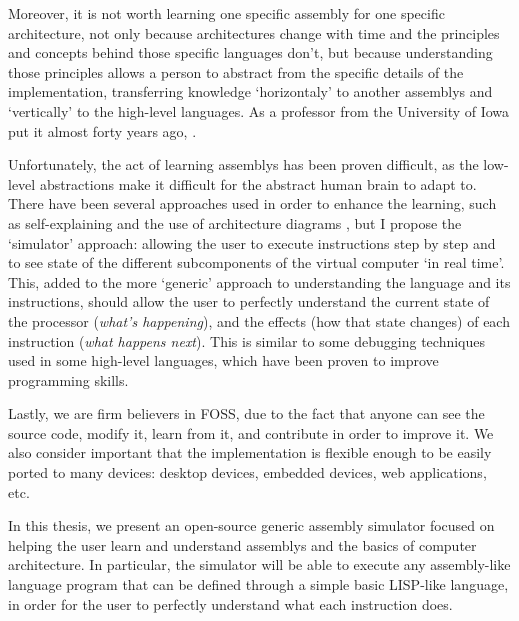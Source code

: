 Moreover, it is not worth learning one specific \gls{assembly} for one specific architecture, not only because architectures change with time and the principles and concepts behind those specific languages don't, but because understanding those principles allows a person to abstract from the specific details of the implementation, transferring knowledge `horizontaly' to another \glspl{assembly} and `vertically' to the \glspl{high-level language}. As a professor from the University of Iowa put it almost forty years ago, .


Unfortunately, the act of learning \glspl{assembly} has been proven difficult, as the low-level abstractions make it difficult for the abstract human brain to adapt to. There have been several approaches used in order to enhance the learning, such as self-explaining and the use of architecture diagrams \supercite{HungY.-C2012CSWC}, but I propose the `simulator' approach: allowing the user to execute instructions step by step and to see state of the different subcomponents of the virtual computer `in real time'. This, added to the more `generic' approach to understanding the language and its instructions, should allow the user to perfectly understand the current state of the processor (\textit{what's happening}), and the effects (how that state changes) of each instruction (\textit{what happens next}). This is similar to some \gls{debugging} techniques used in some \glspl{high-level language}, which have been proven to improve programming skills\supercite{KLAHR1988362}.


Lastly, we are firm believers in \gls{FOSS}, due to the fact that anyone can see the source code, modify it, learn from it, and contribute in order to improve it. We also consider important that the implementation is flexible enough to be easily ported to many devices: \glspl{desktop device}, \glspl{embedded device}, \glspl{web application}, etc.


In this thesis, we present an open-source generic \gls{assembly} simulator focused on helping the user learn and understand \glspl{assembly} and the basics of computer architecture. In particular, the simulator will be able to execute any assembly-like language program that can be defined through a simple basic LISP-like language, in order for the user to perfectly understand what each instruction does.



